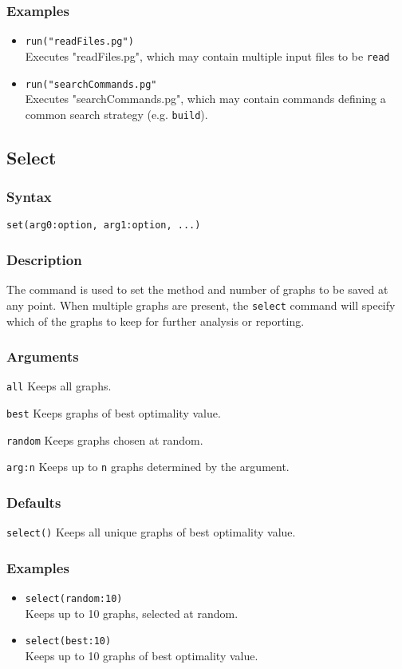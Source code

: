 \documentclass[11pt]{article}
\begin{document}
		\subsubsection{Examples}
				\begin{itemize}
				\item{\texttt{run("readFiles.pg")}\\ Executes "readFiles.pg", which may contain multiple input files to be \texttt{read}}
				\item{\texttt{run("searchCommands.pg"}\\ Executes "searchCommands.pg", which may contain commands defining a common search strategy (e.g. \texttt{build}).}
			\end{itemize}
	
	\subsection{Select}
		\subsubsection{Syntax}
			\texttt{set(arg0:option, arg1:option, ...)}
		\subsubsection{Description}
			The command is used to set the method and number of graphs to be saved at any point.
			When multiple graphs are present, the \texttt{select} command will specify which of the graphs to
			keep for further analysis or reporting.
		\subsubsection{Arguments}
			\noindent \texttt{all} Keeps all graphs.
		
			\smallskip		
			\noindent \texttt{best} Keeps graphs of best optimality value.
			
			\smallskip		
			\noindent \texttt{random} Keeps graphs chosen at random.
			
			\smallskip		
			\noindent \texttt{arg:n} Keeps up to \texttt{n} graphs determined by the argument.
		\subsubsection{Defaults}
			\texttt{select()} Keeps all unique graphs of best optimality value.
		\subsubsection{Examples}
				\begin{itemize}
					\item{\texttt{select(random:10)}\\ Keeps up to 10 graphs, selected at random.}
					\item{\texttt{select(best:10)}\\ Keeps up to 10 graphs of best optimality value.}
				\end{itemize}
			
\end{document}
